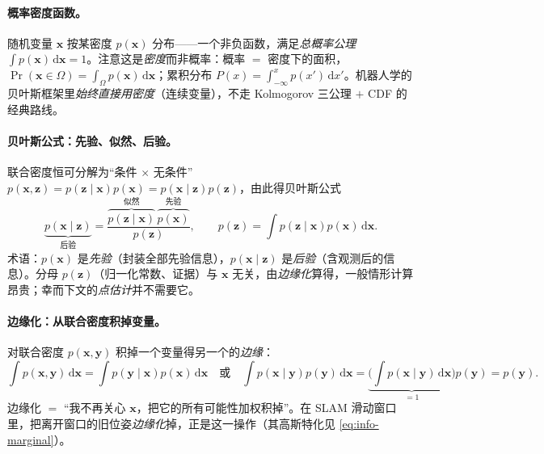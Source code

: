 \paragraph{概率密度函数。}
随机变量 $\mathbf{x}$ 按某密度 $p(\mathbf{x})$ 分布——一个非负函数，满足\emph{总概率公理} $\int p(\mathbf{x})\,\mathrm{d}\mathbf{x}=1$。注意这是\emph{密度}而非概率：概率 $=$ 密度下的面积，$\Pr(\mathbf{x}\in\Omega)=\int_\Omega p(\mathbf{x})\,\mathrm{d}\mathbf{x}$；累积分布 $P(x)=\int_{-\infty}^{x}p(x')\,\mathrm{d}x'$。机器人学的贝叶斯框架里\emph{始终直接用密度}（连续变量），不走 Kolmogorov 三公理 $+$ CDF 的经典路线\cite{barfoot2024state}。

\paragraph{贝叶斯公式：先验、似然、后验。}
联合密度恒可分解为“条件 $\times$ 无条件” $p(\mathbf{x},\mathbf{z})=p(\mathbf{z}\mid\mathbf{x})p(\mathbf{x})=p(\mathbf{x}\mid\mathbf{z})p(\mathbf{z})$，由此得贝叶斯公式\cite{barfoot2024state}
\begin{equation}
  \underbrace{p(\mathbf{x}\mid\mathbf{z})}_{\text{后验}}
  =\frac{\overbrace{p(\mathbf{z}\mid\mathbf{x})}^{\text{似然}}\,\overbrace{p(\mathbf{x})}^{\text{先验}}}{p(\mathbf{z})},
  \qquad p(\mathbf{z})=\int p(\mathbf{z}\mid\mathbf{x})p(\mathbf{x})\,\mathrm{d}\mathbf{x}.
  \label{eq:bayes}
\end{equation}
术语：$p(\mathbf{x})$ 是\emph{先验}（封装全部先验信息），$p(\mathbf{x}\mid\mathbf{z})$ 是\emph{后验}（含观测后的信息）。分母 $p(\mathbf{z})$（归一化常数、证据）与 $\mathbf{x}$ 无关，由\emph{边缘化}算得，一般情形计算昂贵；幸而下文的\emph{点估计}并不需要它。

\paragraph{边缘化：从联合密度积掉变量。}
对联合密度 $p(\mathbf{x},\mathbf{y})$ 积掉一个变量得另一个的\emph{边缘}\cite{barfoot2024state}：
\begin{equation}
  \int p(\mathbf{x},\mathbf{y})\,\mathrm{d}\mathbf{x}
  =\int p(\mathbf{y}\mid\mathbf{x})p(\mathbf{x})\,\mathrm{d}\mathbf{x}
  \quad\text{或}\quad
  \int p(\mathbf{x}\mid\mathbf{y})p(\mathbf{y})\,\mathrm{d}\mathbf{x}=\underbrace{\Big(\textstyle\int p(\mathbf{x}\mid\mathbf{y})\,\mathrm{d}\mathbf{x}\Big)}_{=1}p(\mathbf{y})=p(\mathbf{y}).
  \label{eq:marginalize}
\end{equation}
边缘化 $=$ “我不再关心 $\mathbf{x}$，把它的所有可能性加权积掉”。在 SLAM 滑动窗口里，把离开窗口的旧位姿\emph{边缘化}掉，正是这一操作（其高斯特化见 \cref{eq:info-marginal}）。

